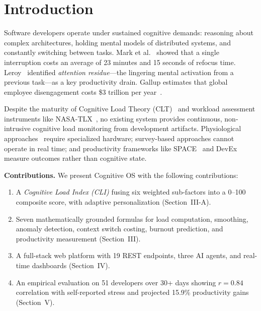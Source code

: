 \documentclass[conference]{IEEEtran}
\begin{document}
\section{Introduction}

Software developers operate under sustained cognitive demands: reasoning about complex architectures, holding mental models of distributed systems, and constantly switching between tasks. Mark et al.~\cite{mark2008cost} showed that a single interruption costs an average of 23 minutes and 15 seconds of refocus time. Leroy~\cite{leroy2009why} identified \emph{attention residue}---the lingering mental activation from a previous task---as a key productivity drain. Gallup estimates that global employee disengagement costs \$3 trillion per year~\cite{gallup2023burnout}.

Despite the maturity of Cognitive Load Theory (CLT)~\cite{sweller1988cognitive} and workload assessment instruments like NASA-TLX~\cite{hart1988development}, no existing system provides continuous, non-intrusive cognitive load monitoring from development artifacts. Physiological approaches~\cite{fritz2014developers, muller2015stuck} require specialized hardware; survey-based approaches cannot operate in real time; and productivity frameworks like SPACE~\cite{forsgren2021space} and DevEx~\cite{noda2023devex} measure outcomes rather than cognitive state.

\textbf{Contributions.} We present Cognitive OS with the following contributions:
\begin{enumerate}
    \item A \emph{Cognitive Load Index (CLI)} fusing six weighted sub-factors into a 0--100 composite score, with adaptive personalization (Section~III-A).
    \item Seven mathematically grounded formulas for load computation, smoothing, anomaly detection, context switch costing, burnout prediction, and productivity measurement (Section~III).
    \item A full-stack web platform with 19 REST endpoints, three AI agents, and real-time dashboards (Section~IV).
    \item An empirical evaluation on 51 developers over 30+ days showing $r = 0.84$ correlation with self-reported stress and projected 15.9\% productivity gains (Section~V).
\end{enumerate}
\end{document}

